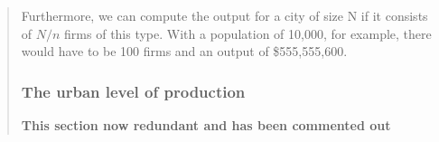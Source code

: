 \begin{quotation}
Furthermore, we can compute the output for a city of size N if it consists of $N/n$ firms of this type. With a population of 10,000, for example,  there would have to be  100 firms and an output of \$555,555,600. 

 \subsubsection{The urban level of production}
 \textbf{This section now redundant and has been commented out}







\end{quotation}



